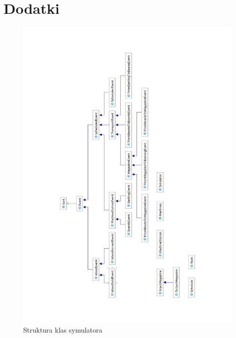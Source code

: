 \documentclass[a4paper]{article}
\begin{document}
\section{Dodatki}
\begin{figure}
\includegraphics[scale=0.8]{img/diagram.pdf}
\caption{Struktura klas symulatora}
\end{figure}
{}

\end{document}
